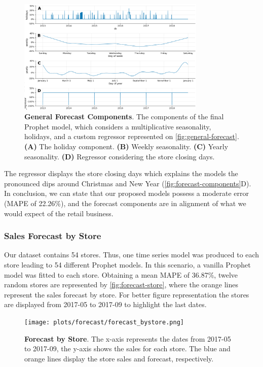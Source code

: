 \begin{figure}[!htb]
  \centering
  \includegraphics[width=0.8\textwidth]{plots/forecast/forecast_prophet-components.png}
  \caption[General Forecast Components]{\textbf{General Forecast Components}. The components of the final Prophet model, which considers a multiplicative seasonality, holidays, and a custom regressor represented on \autoref{fig:general-forecast}. \textbf{(A)} The holiday component. \textbf{(B)} Weekly seasonality. \textbf{(C)} Yearly seasonality. \textbf{(D)} Regressor considering the store closing days.}
  \label{fig:forecast-components}
\end{figure}

The regressor displays the store closing days which explains the models the pronounced dips around Christmas and New Year (\autoref{fig:forecast-components}D). In conclusion, we can state that our proposed models possess a moderate error (MAPE of 22.26\%), and the forecast components are in alignment of what we would expect of the retail business.   

\subsubsection[Sales Forecast by Store]{Sales Forecast by Store}
\label{sec:forecast-store}

Our dataset contains 54 stores. Thus, one time series model was produced to each store leading to 54 different Prophet models. In this scenario, a vanilla Prophet model was fitted to each store. Obtaining a mean MAPE of 36.87\%, twelve random stores are represented by \autoref{fig:forecast-store}, where the orange lines represent the sales forecast by store. For better figure representation the stores are displayed from 2017-05 to 2017-09 to highlight the last dates. 

\begin{figure}[!htb]
  \centering
  \texttt{[image: plots/forecast/forecast\_bystore.png]}
  \caption[Forecast by Store]{\textbf{Forecast by Store}. The x-axis represents the dates from 2017-05 to 2017-09, the y-axis shows the sales for each store. The blue and orange lines display the store sales and forecast, respectively.}
  \label{fig:forecast-store}
\end{figure}


